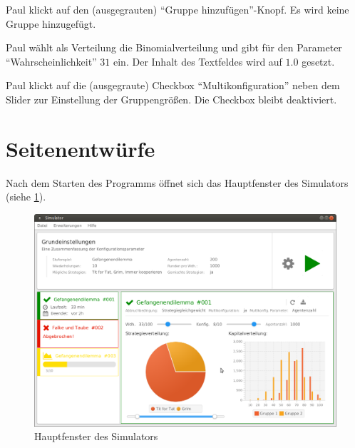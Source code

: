 \documentclass[parskip=full,11pt]{scrartcl}
\begin{document}
{Paul klickt auf den (ausgegrauten) \enquote{Gruppe hinzufügen}-Knopf.}
{Es wird keine Gruppe hinzugefügt.}

{Paul wählt als Verteilung die Binomialverteilung und gibt für den Parameter \enquote{Wahrscheinlichkeit} \(31\) ein.}
{Der Inhalt des Textfeldes wird auf \(1.0\) gesetzt.}

{Paul klickt auf die (ausgegraute) Checkbox \enquote{Multikonfiguration} neben dem Slider zur Einstellung der Gruppengrößen.}
{Die Checkbox bleibt deaktiviert.}

\appendix
\newpage
\section{Seitenentwürfe}

Nach dem Starten des Programms öffnet sich das Hauptfenster des Simulators \\(siehe \cref{fig:home}).

\begin{figure}[hb]
	\includegraphics[width=\textwidth]{images/home.png}
	\caption{\label{fig:home}
		Hauptfenster des Simulators}
\end{figure}
\end{document}
